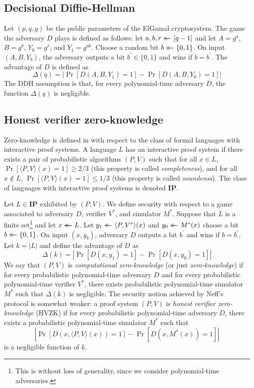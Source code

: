 \documentclass[letter]{article}
\newcounter{foot}
\newcommand{\bits}{\{0,1\}}
\newcommand{\getsr}{\mathrel{\leftarrow\mkern-14mu\leftarrow}}
\newcommand{\brackets}[1]{\langle #1 \rangle}
\newcommand{\class}[1]{\mathbf{#1}}
\newcommand{\advD}{D}
\begin{document}
\subsection{Decisional Diffie-Hellman} \label{sec-ddh}

Let $(p, q, g)$ be the public parameters of the ElGamal cryptosystem. The game
the adversary $\advD$ plays is defined as follows: let $a, b, r \getsr
[q-1]$ and let $A = g^a$, $B = g^b$, $Y_0 = g^r$, and $Y_1 = g^{ab}$. Choose
a random bit $b \getsr \bits$. On input $(A, B, Y_b)$, the adversary outputs a
bit $b^\prime \in \bits$ and wins if $b=b^\prime$. The advantage of $\advD$ is
defined as
\[
  \Delta(q) = |\Pr[\advD(A, B, Y_1)=1] - \Pr[\advD(A, B, Y_0)=1]|
\]
The DDH assumption is that, for every polynomial-time adversary $\advD$, the
function $\Delta(q)$ is negligible.

\subsection{Honest verifier zero-knowledge}

Zero-knowledge is defined in \cite{goldreich} with respect to the class of
formal languages with interactive proof systems. A language $L$ has an
interactive proof system if there exists a pair of probabilistic algorithms $(P,
V)$ such that for all $x \in L$, $\Pr[\brackets{P, V}(x) = 1] \ge 2/3$
(this property is called \emph{completeness}), and for all
$x \not\in L$, $\Pr[\brackets{P, V}(x) = 1] \le 1/3$ (this property is called
\emph{soundenss}). The class of languages
with interactive proof systems is denoted $\class{IP}$.

Let $L \in \class{IP}$
exhibited by $(P, V)$. We define security with respect to a game associated to
adversary $D$, verifier $V^*$, and simulator $M^*$. Suppose that $L$ is a finite
set\footnote{This is without loss of generality, since we
consider polynomial-time adversaries.} and let $x \getsr L$. Let $y_1 \getsr
\brackets{P, V^*}(x)$ and $y_0 \getsr M^*(x)$ choose a bit $b \getsr \bits$.
On input $(x, y_b)$, adversary $\advD$ outputs a bit $b^\prime$ and wins if
$b=b^\prime$. Let $k = |L|$ and define the advantage of $\advD$ as
\[
  \Delta(k) = |\Pr[\advD(x, y_1)=1] - \Pr[\advD(x, y_0)=1]|
\]
We say that $(P, V)$ is \emph{computational zero-knowledge} (or just
\emph{zero-knowledge}) if
for every probabilistic polynomial-time adversary $\advD$ and
  for every probabilistic polynomial-time verifier $V^*$,
    there exists probabilistic polynomial-time simulator $M^*$ such that $\Delta(k)$ is
    negligible.
The security notion achieved by Neff's protocol is somewhat weaker: a proof system $(P, V)$ is
\emph{honest verifier zero-knowledge} (HVZK) if
for every probabilistic polynomial-time adversary $\advD$,
  there exists a probabilistic polynomial-time simulator $M^*$ such that
\[
  |\Pr[\advD(x, \brackets{P,V}(x))=1] - \Pr[\advD(x, M^*(x))=1]|
\]
is a negligible function of $k$.
\end{document}
